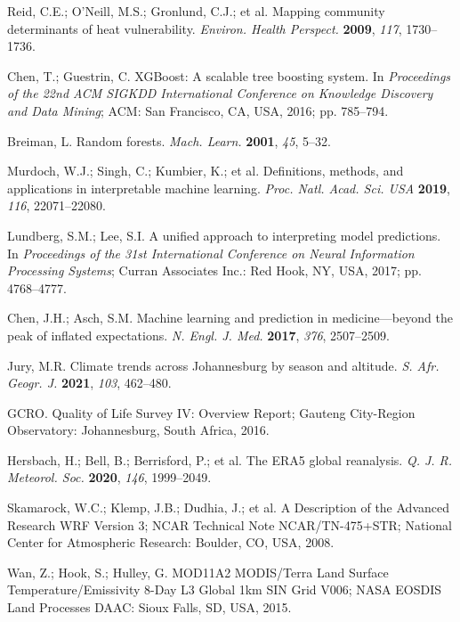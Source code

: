 \documentclass[11pt,a4paper]{article}
\begin{document}
\begin{thebibliography}{99}
Reid, C.E.; O'Neill, M.S.; Gronlund, C.J.; et al. Mapping community determinants of heat vulnerability. \textit{Environ. Health Perspect.} \textbf{2009}, \textit{117}, 1730--1736.

Chen, T.; Guestrin, C. XGBoost: A scalable tree boosting system. In \textit{Proceedings of the 22nd ACM SIGKDD International Conference on Knowledge Discovery and Data Mining}; ACM: San Francisco, CA, USA, 2016; pp. 785--794.

Breiman, L. Random forests. \textit{Mach. Learn.} \textbf{2001}, \textit{45}, 5--32.

Murdoch, W.J.; Singh, C.; Kumbier, K.; et al. Definitions, methods, and applications in interpretable machine learning. \textit{Proc. Natl. Acad. Sci. USA} \textbf{2019}, \textit{116}, 22071--22080.

Lundberg, S.M.; Lee, S.I. A unified approach to interpreting model predictions. In \textit{Proceedings of the 31st International Conference on Neural Information Processing Systems}; Curran Associates Inc.: Red Hook, NY, USA, 2017; pp. 4768--4777.

Chen, J.H.; Asch, S.M. Machine learning and prediction in medicine—beyond the peak of inflated expectations. \textit{N. Engl. J. Med.} \textbf{2017}, \textit{376}, 2507--2509.

Jury, M.R. Climate trends across Johannesburg by season and altitude. \textit{S. Afr. Geogr. J.} \textbf{2021}, \textit{103}, 462--480.

GCRO. Quality of Life Survey IV: Overview Report; Gauteng City-Region Observatory: Johannesburg, South Africa, 2016.

Hersbach, H.; Bell, B.; Berrisford, P.; et al. The ERA5 global reanalysis. \textit{Q. J. R. Meteorol. Soc.} \textbf{2020}, \textit{146}, 1999--2049.

Skamarock, W.C.; Klemp, J.B.; Dudhia, J.; et al. A Description of the Advanced Research WRF Version 3; NCAR Technical Note NCAR/TN-475+STR; National Center for Atmospheric Research: Boulder, CO, USA, 2008.

Wan, Z.; Hook, S.; Hulley, G. MOD11A2 MODIS/Terra Land Surface Temperature/Emissivity 8-Day L3 Global 1km SIN Grid V006; NASA EOSDIS Land Processes DAAC: Sioux Falls, SD, USA, 2015.


\end{thebibliography}
\end{document}
